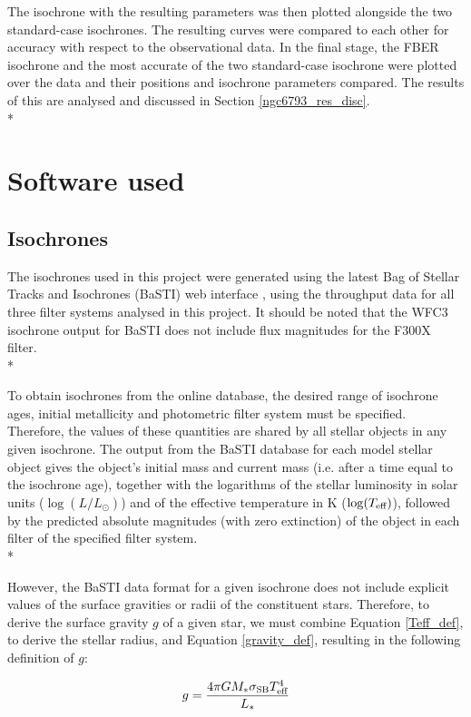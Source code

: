 \documentclass[12pt, a4paper]{report}
\begin{document}
The isochrone with the resulting parameters was then plotted alongside the two standard-case isochrones. The resulting curves were compared to each other for accuracy with respect to the observational data. In the final stage, the FBER isochrone and the most accurate of the two standard-case isochrone were plotted over the data and their positions and isochrone parameters compared. The results of this are analysed and discussed in Section \ref{ngc6793_res_disc}. \\* 


\section{Software used}
\subsection{Isochrones}
The isochrones used in this project were generated using the latest Bag of Stellar Tracks and Isochrones (BaSTI) web interface \citep{2004ApJ...612..168P,2018ApJ...856..125H}, using the throughput data for all three filter systems analysed in this project. It should be noted that the WFC3 isochrone output for BaSTI does not include flux magnitudes for the F300X filter.\\*

To obtain isochrones from the online database, the desired range of isochrone ages, initial metallicity and photometric filter system must be specified. Therefore, the values of these quantities are shared by all stellar objects in any given isochrone. The output from the BaSTI database for each model stellar object gives the object's initial mass and current mass (i.e. after a time equal to the isochrone age), together with the logarithms of the stellar luminosity in solar units ($\log(L/L_{\odot})$) and of the effective temperature in K ($\log(T_{\textnormal{eff}})$), followed by the predicted absolute magnitudes (with zero extinction) of the object in each filter of the specified filter system. \\*

However, the BaSTI data format for a given isochrone does not include explicit values of the surface gravities or radii of the constituent stars. Therefore, to derive the surface gravity $g$ of a given star, we must combine Equation \ref{Teff_def}, to derive the stellar radius, and Equation \ref{gravity_def}, resulting in the following definition of $g$:

\begin{equation}
\label{gravity_LT_calc}
g = \frac{4 \pi G M_{*} \sigma_{\textnormal{SB}} T_{\textnormal{eff}}^{4}}{L_{*}}
\end{equation}
\end{document}
